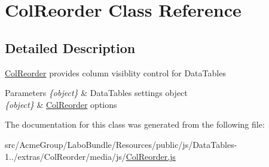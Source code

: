 \hypertarget{class_col_reorder}{\section{Col\+Reorder Class Reference}
\label{class_col_reorder}
}


\subsection{Detailed Description}
\hyperlink{class_col_reorder}{Col\+Reorder} provides column visiblity control for Data\+Tables


\begin{DoxyParams}{Parameters}
{\em \{object\}} & Data\+Tables settings object \\
\hline
{\em \{object\}} & \hyperlink{class_col_reorder}{Col\+Reorder} options \\
\hline
\end{DoxyParams}


The documentation for this class was generated from the following file\+:\begin{DoxyCompactItemize}
\item 
src/\+Acme\+Group/\+Labo\+Bundle/\+Resources/public/js/\+Data\+Tables-\/1../extras/\+Col\+Reorder/media/js/\hyperlink{_col_reorder_8js}{Col\+Reorder.\+js}\end{DoxyCompactItemize}
